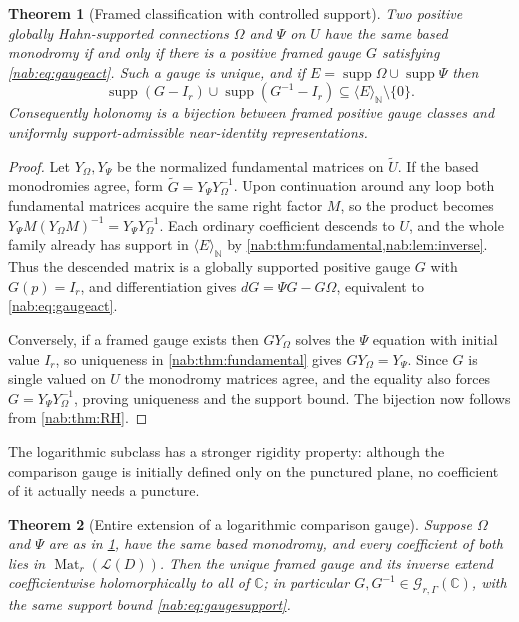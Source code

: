 \documentclass[11pt,letterpaper]{article}
\newtheorem{theorem}{Theorem}[section]
\theoremstyle{definition}
\theoremstyle{remark}
\newcommand{\C}{\mathbb C}
\newcommand{\N}{\mathbb N}
\newcommand{\GG}{\mathscr G_{r,\Gamma}}
\newcommand{\LL}{\mathcal L}
\newcommand{\Mat}{\operatorname{Mat}}
\newcommand{\supp}{\operatorname{supp}}
\newcommand{\angles}[1]{\langle #1\rangle_{\N}}
\numberwithin{equation}{section}
\begin{document}
\begin{theorem}[Framed classification with controlled support]
\label{nab:thm:gauge}
Two positive globally Hahn-supported connections $\Omega$ and $\Psi$ on $U$
have the same based monodromy if and only if there is a positive framed gauge
$G$ satisfying \eqref{nab:eq:gaugeact}. Such a gauge is unique, and if
$E=\supp\Omega\cup\supp\Psi$ then
\begin{equation}\label{nab:eq:gaugesupport}
 \supp(G-I_r)\cup\supp(G^{-1}-I_r)\subseteq\angles E\setminus\{0\}.
\end{equation}
Consequently holonomy is a bijection between framed positive gauge classes and
uniformly support-admissible near-identity representations.
\end{theorem}

\begin{proof}
Let $Y_\Omega,Y_\Psi$ be the normalized fundamental matrices on
$\widetilde U$. If the based monodromies agree, form
$\widetilde G=Y_\Psi Y_\Omega^{-1}$. Upon continuation around any loop both
fundamental matrices acquire the same right factor $M$, so the product becomes
$Y_\Psi M(Y_\Omega M)^{-1}=Y_\Psi Y_\Omega^{-1}$. Each ordinary coefficient
descends to $U$, and the whole family already has support in $\angles E$ by
\cref{nab:thm:fundamental,nab:lem:inverse}. Thus the descended matrix is a
globally supported positive gauge $G$ with $G(p)=I_r$, and differentiation
gives $dG=\Psi G-G\Omega$, equivalent to \eqref{nab:eq:gaugeact}.

Conversely, if a framed gauge exists then $GY_\Omega$ solves the $\Psi$
equation with initial value $I_r$, so uniqueness in
\cref{nab:thm:fundamental} gives $GY_\Omega=Y_\Psi$. Since $G$ is single
valued on $U$ the monodromy matrices agree, and the equality also forces
$G=Y_\Psi Y_\Omega^{-1}$, proving uniqueness and the support bound. The
bijection now follows from \cref{nab:thm:RH}.
\end{proof}

The logarithmic subclass has a stronger rigidity property: although the
comparison gauge is initially defined only on the punctured plane, no
coefficient of it actually needs a puncture.

\begin{theorem}[Entire extension of a logarithmic comparison gauge]
\label{nab:thm:entiregauge}
Suppose $\Omega$ and $\Psi$ are as in \cref{nab:thm:gauge}, have the same
based monodromy, and every coefficient of both lies in $\Mat_r(\LL(D))$. Then
the unique framed gauge and its inverse extend coefficientwise holomorphically
to all of $\C$; in particular $G,G^{-1}\in\GG(\C)$, with the same support
bound \eqref{nab:eq:gaugesupport}.
\end{theorem}
\end{document}

